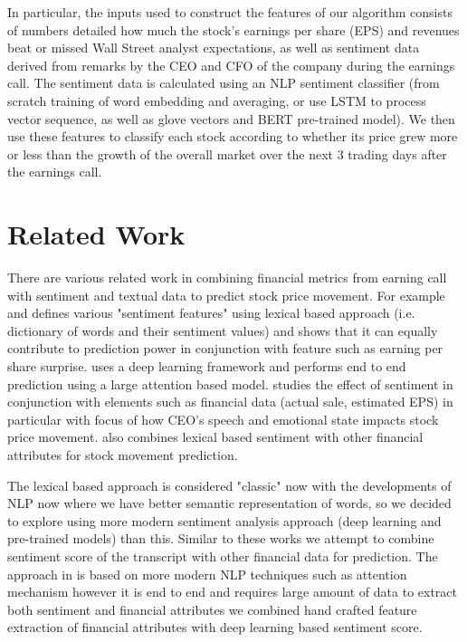\documentclass{article}
\begin{document}
In particular, the inputs used to construct the features of our algorithm consists of numbers detailed how much the stock's earnings per share (EPS) and revenues beat or missed Wall Street analyst expectations, as well as sentiment data derived from remarks by the CEO and CFO of the company during the earnings call.
The sentiment data is calculated using an NLP sentiment classifier (from scratch training of word embedding and averaging, or use LSTM to process vector sequence, as well as glove vectors and BERT pre-trained model).
We then use these features to classify each stock according to whether its price grew more or less than the growth of the overall market over the next 3 trading days after the earnings call.


\section{Related Work}
There are various related work in combining financial metrics from earning call with sentiment
and textual data to predict stock price movement. For example \citep{jayaraman2020can} 
and \citep{Solberg2018ThePP}
defines various "sentiment features" using lexical based approach (i.e. dictionary of words
and their sentiment values) and shows that it can equally contribute to prediction power in conjunction
with feature such as earning per share surprise. \citep{ma2020towards} uses a deep learning
framework and performs end to end prediction using a large attention based model. \citep{medya2022exploratory}
studies the effect of sentiment in conjunction with elements such as financial data (actual sale, 
estimated EPS) in particular with focus of how CEO's speech and emotional state impacts stock price
movement.  \citep{liang2016predicting} also combines lexical based sentiment with other
financial attributes for stock movement prediction. 

The lexical based approach is considered "classic" now with the developments of NLP now where
we have better semantic representation of words, so we decided to explore using more modern
sentiment analysis approach (deep learning and pre-trained models) than this. Similar to these
works we attempt to combine sentiment score of the transcript with other financial data for prediction. 
The approach in \citep{ma2020towards} is based on more modern NLP techniques such as attention mechanism
however it is end to end and requires large amount of data to extract both sentiment and financial attributes
we combined hand crafted feature extraction of financial attributes with deep learning based sentiment score.
\end{document}
